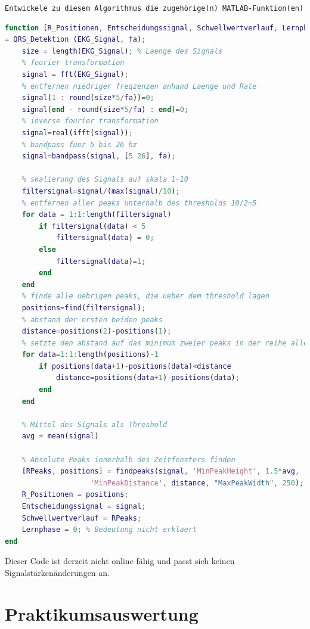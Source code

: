 \documentclass[a4paper,12pt,titlepage]{scrartcl}
\begin{document}
\texttt{Entwickele zu diesem Algorithmus die zugehörige(n) MATLAB-Funktion(en)}

\begin{lstlisting}[basicstyle=\scriptsize, language=matlab]
function [R_Positionen, Entscheidungssignal, Schwellwertverlauf, Lernphase] 
= QRS_Detektion (EKG_Signal, fa);
    size = length(EKG_Signal); % Laenge des Signals
    % fourier transformation
    signal = fft(EKG_Signal);
    % entfernen niedriger freqzenzen anhand Laenge und Rate
    signal(1 : round(size*5/fa))=0;
    signal(end - round(size*5/fa) : end)=0;
    % inverse fourier transformation
    signal=real(ifft(signal));
    % bandpass fuer 5 bis 26 hz
    signal=bandpass(signal, [5 26], fa);

    % skalierung des Signals auf skala 1-10
    filtersignal=signal/(max(signal)/10);
    % entfernen aller peaks unterhalb des thresholds 10/2=5
    for data = 1:1:length(filtersignal)
        if filtersignal(data) < 5
            filtersignal(data) = 0;
        else
            filtersignal(data)=1;
        end
    end
    % finde alle uebrigen peaks, die ueber dem threshold lagen
    positions=find(filtersignal);
    % abstand der ersten beiden peaks
    distance=positions(2)-positions(1);
    % setzte den abstand auf das minimum zweier peaks in der reihe aller uebrigen peaks
    for data=1:1:length(positions)-1
        if positions(data+1)-positions(data)<distance
            distance=positions(data+1)-positions(data);
        end
    end

    % Mittel des Signals als Threshold
    avg = mean(signal) 
    
    % Absolute Peaks innerhalb des Zeitfensters finden
    [RPeaks, positions] = findpeaks(signal, 'MinPeakHeight', 1.5*avg, 
                    'MinPeakDistance', distance, "MaxPeakWidth", 250);
    R_Positionen = positions;
    Entscheidungssignal = signal;
    Schwellwertverlauf = RPeaks;
    Lernphase = 0; % Bedeutung nicht erklaert
end
\end{lstlisting}

Dieser Code ist derzeit nicht online fähig und passt sich keinen Signalstärkenänderungen an.

\newpage
\section{Praktikumsauswertung}
\end{document}
